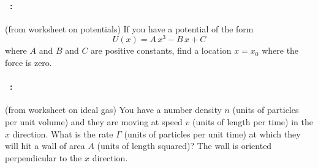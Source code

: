 \documentclass[12pt]{article} 
\begin{document}
\vfill

\paragraph{\problemname~\theproblem:}%
(from worksheet on potentials)
If you have a potential of the form
$$
U(x) = A\,x^3 - B\,x + C
$$ where $A$ and $B$ and $C$ are positive constants, find a location $x=x_0$ where
the force is zero.

\vfill

\paragraph{\problemname~\theproblem:}%
(from worksheet on ideal gas)
You have a number density $n$ (units of particles per unit volume)
and they are moving at speed $v$ (units of length per time)
in the $x$ direction.
What is the rate $\Gamma$ (units of particles per unit time) at which they
will hit a wall of area $A$ (units of length squared)?
The wall is oriented perpendicular to the $x$ direction.

\vfill
~
\end{document}
